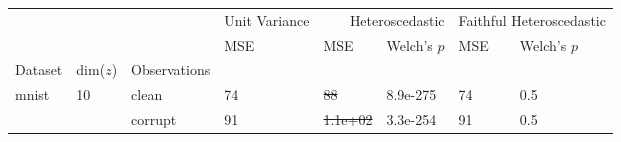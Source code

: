 \begin{tabular}{lll|l|ll|ll}
\toprule
 &  &  & Unit Variance & \multicolumn{2}{r}{Heteroscedastic} & \multicolumn{2}{r}{Faithful Heteroscedastic} \\
 &  &  & MSE & MSE & Welch's $p$ & MSE & Welch's $p$ \\
Dataset & dim($z$) & Observations &  &  &  &  &  \\
\midrule
\multirow[c]{2}{*}{mnist} & \multirow[c]{2}{*}{10} & clean & 74 & \sout{88} & 8.9e-275 & 74 & 0.5 \\
 &  & corrupt & 91 & \sout{1.1e+02} & 3.3e-254 & 91 & 0.5 \\
\bottomrule
\end{tabular}
